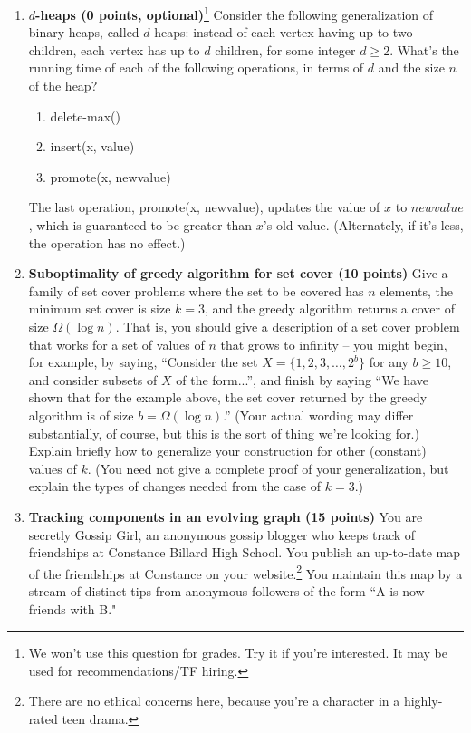 \documentclass[11pt]{article}
\begin{document}
\begin{enumerate}
\item 
{\bf $d$-heaps (0 points, optional)}\footnote{We won't use this question for grades. Try it if you're interested. 
It may be used for recommendations/TF hiring.}
Consider the following generalization of binary heaps, called $d$-heaps: instead of each vertex having up to two children, each vertex has up to $d$ children, for some integer $d \ge 2$. What's the running time of each of the following operations, in terms of $d$ and the size $n$ of the heap?
\begin{enumerate}
\item delete-max()
\item insert(x, value)
\item promote(x, newvalue)
\end{enumerate}
The last operation, promote(x, newvalue), updates the value of $x$ to $newvalue$, which is guaranteed to be greater than $x$'s old value. (Alternately, if it's less, the operation has no effect.)

\item {\bf Suboptimality of greedy algorithm for set cover (10 points)}
Give a family of set cover problems where the set to be covered
has $n$ elements, the minimum set cover is size $k = 3$, and the
greedy algorithm returns a cover of size $\Omega(\log n)$.  That is,
you should give a description of a set cover problem that works for a
set of values of $n$ that grows to infinity -- you might begin, for
example, by saying, ``Consider the set $X = \{1,2,3,\ldots,2^b\}$ for
any $b \geq 10$, and consider subsets of $X$ of the form...'', and
finish by saying ``We have shown that for the example above, the set
cover returned by the greedy algorithm is of size $b = \Omega(\log
n)$.''  (Your actual wording may differ substantially, of course, but
this is the sort of thing we're looking for.)  Explain briefly how to
generalize your construction for other (constant) values of $k$.  (You
need not give a complete proof of your generalization, but explain the
types of changes needed from the case of $k=3$.)


\item {\bf Tracking components in an evolving graph (15 points)}
You are secretly Gossip Girl, an anonymous gossip blogger who keeps track of friendships at Constance Billard High School. You publish an up-to-date map of the friendships at Constance on your website.\footnote{There are no ethical concerns here, because you're a character in a highly-rated teen drama.} You maintain this map by a stream of distinct tips from anonymous followers of the form ``A is now friends with B." 


\end{enumerate}
\end{document}
